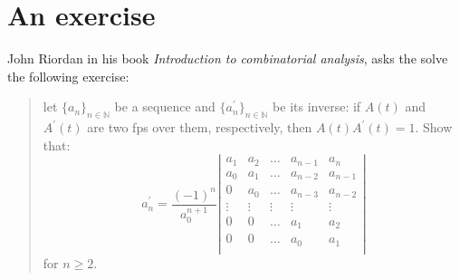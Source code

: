 \documentclass[11pt,a4paper]{article} %
\begin{document}
    \title{\rmfamily\normalfont{}}
    \author{ \\ }
    \date{\today} 
    
    \maketitle
    
    \begin{abstract}
        This short document is a collection of some \emph{Riordan arrays}, coloured 
        according different partition schemes.
    \end{abstract}
       
    \tableofcontents

    \newpage

    \section*{An exercise}

    John Riordan in his book \emph{Introduction to combinatorial analysis},
    asks the solve the following exercise:
    \begin{quote}
        let $\lbrace a_{n} \rbrace_{n\in\mathbb{N}}$ be a sequence and
        $\lbrace a_{n}^{\prime} \rbrace_{n\in\mathbb{N}}$ be its inverse:
        if $A(t)$ and $A^{\prime}(t)$ are two fps over them, respectively, 
            then $A(t)A^{\prime}(t)=1$. Show that:
        \begin{displaymath}                
            a_{n}^{\prime} = \frac{(-1)^{n}}{a_{0}^{n+1}}
                \left|
                \begin{array}{ccccc}
                    a_1 & a_2 & \ldots & a_{n-1} & a_{n}\\
                    a_0 & a_1 & \ldots & a_{n-2} & a_{n-1}\\
                    0   & a_0 & \ldots & a_{n-3} & a_{n-2}\\
                    \vdots & \vdots & \vdots & \vdots & \vdots\\
                    0 & 0 & \ldots & a_{1} & a_{2}\\
                    0 & 0 & \ldots & a_{0} & a_{1}\\
                \end{array}
                \right|
        \end{displaymath}                
        for $n \geq 2$.
    \end{quote}
\end{document}

